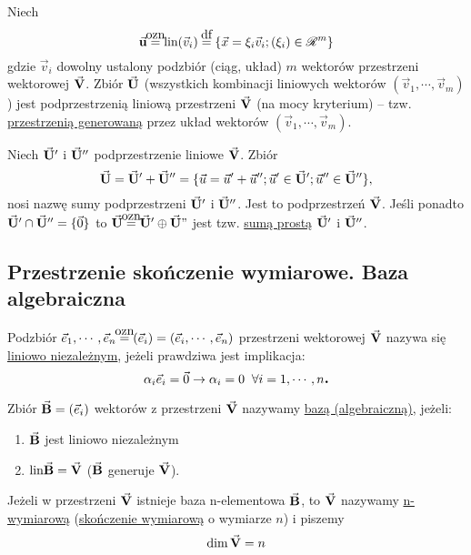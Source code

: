\begin{example}
   Niech
   \[\vset{u} \ozn \lin (\vec{v}_i) \df \{\vec{x} = \xi_i \vec{v}_i; (\xi_i) \in \real^m\}\]
   gdzie $\vec{v}_i$ dowolny ustalony podzbiór (ciąg, układ) $m$ wektorów przestrzeni wektorowej $\vec{\mathbf{V}}$. Zbiór $\vec{\mathbf{U}}$ (wszystkich kombinacji liniowych wektorów $(\vec{v}_1, \cdots, \vec{v}_m)$) jest podprzestrzenią liniową przestrzeni $\vec{\mathbf{V}}$ (na mocy kryterium) -- tzw. \underline{przestrzenią generowaną} przez układ wektorów $(\vec{v}_1, \cdots, \vec{v}_m)$.
\end{example}

\begin{mydef}
   Niech $\vec{\mathbf{U}}'$ i $\vec{\mathbf{U}}''$ podprzestrzenie liniowe $\vec{\mathbf{V}}$. Zbiór
   \[\vec{\mathbf{U}} = \vec{\mathbf{U}}' + \vec{\mathbf{U}}'' = \{\vec{u} = \vec{u}' + \vec{u}''; \vec{u}' \in \vec{\mathbf{U}}'; \vec{u}'' \in \vec{\mathbf{U}}'' \},\]
   nosi nazwę sumy podprzestrzeni $\vec{\mathbf{U}}'$ i $\vec{\mathbf{U}}''$.
   Jest to podprzestrzeń $\vec{\mathbf{V}}$. Jeśli ponadto $\vec{\mathbf{U}}' \cap \vec{\mathbf{U}}'' = \{\vec{0}\}$ to $\vset{U} \ozn \vset{U}' \oplus \vset{U}"$ jest tzw. \underline{sumą prostą} $\vec{\mathbf{U}}'$ i $\vec{\mathbf{U}}''$.
\end{mydef}

\subsection{Przestrzenie skończenie wymiarowe. Baza algebraiczna}

\begin{mydef} 
   Podzbiór ${\vec{e}_1, \cdots, \vec{e}_n} \ozn (\vec{e}_i) = (\vec{e}_i, \cdots, \vec{e}_n)$ przestrzeni wektorowej $\vec{\mathbf{V}}$ nazywa się \underline{liniowo niezależnym}, jeżeli prawdziwa jest implikacja:
   \[\alpha_i \vec{e}_i = \vec{0} \to \alpha_i = 0\;\; \forall i = 1,\cdots, n \mbox{\large\bfseries .}\]
\end{mydef}

\begin{mydef}
   Zbiór $\vec{\mathbf{B}} = (\vec{e}_i)$ wektorów z przestrzeni $\vec{\mathbf{V}}$ nazywamy \underline{bazą (algebraiczną)}, jeżeli:
   \begin{enumerate}
    \item $\vec{\mathbf{B}}$ jest liniowo niezależnym
	\item $\normalfont\mbox{lin} \vec{\mathbf{B}} = \vec{\mathbf{V}}$ ($\vec{\mathbf{B}}$ generuje $\vec{\mathbf{V}}$).
   \end{enumerate}
\end{mydef}

\begin{mydef}
   Jeżeli w przestrzeni $\vec{\mathbf{V}}$ istnieje baza n-elementowa $\vec{\mathbf{B}}$, to $\vec{\mathbf{V}}$ nazywamy \underline{n-wymiarową} (\underline{skończenie wymiarową} o wymiarze $n$) i piszemy
   \[\dim \vec{\mathbf{V}} = n\]
\end{mydef}

